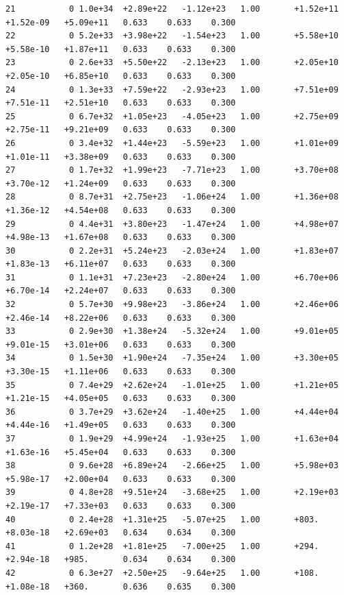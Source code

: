 \documentclass[12pt]{article}
\numberwithin{equation}{section}
\begin{document}
\begin{lstlisting}
21           0 1.0e+34  +2.89e+22   -1.12e+23   1.00       +1.52e+11   +1.52e-09   +5.09e+11   0.633    0.633    0.300
22           0 5.2e+33  +3.98e+22   -1.54e+23   1.00       +5.58e+10   +5.58e-10   +1.87e+11   0.633    0.633    0.300
23           0 2.6e+33  +5.50e+22   -2.13e+23   1.00       +2.05e+10   +2.05e-10   +6.85e+10   0.633    0.633    0.300
24           0 1.3e+33  +7.59e+22   -2.93e+23   1.00       +7.51e+09   +7.51e-11   +2.51e+10   0.633    0.633    0.300
25           0 6.7e+32  +1.05e+23   -4.05e+23   1.00       +2.75e+09   +2.75e-11   +9.21e+09   0.633    0.633    0.300
26           0 3.4e+32  +1.44e+23   -5.59e+23   1.00       +1.01e+09   +1.01e-11   +3.38e+09   0.633    0.633    0.300
27           0 1.7e+32  +1.99e+23   -7.71e+23   1.00       +3.70e+08   +3.70e-12   +1.24e+09   0.633    0.633    0.300
28           0 8.7e+31  +2.75e+23   -1.06e+24   1.00       +1.36e+08   +1.36e-12   +4.54e+08   0.633    0.633    0.300
29           0 4.4e+31  +3.80e+23   -1.47e+24   1.00       +4.98e+07   +4.98e-13   +1.67e+08   0.633    0.633    0.300
30           0 2.2e+31  +5.24e+23   -2.03e+24   1.00       +1.83e+07   +1.83e-13   +6.11e+07   0.633    0.633    0.300
31           0 1.1e+31  +7.23e+23   -2.80e+24   1.00       +6.70e+06   +6.70e-14   +2.24e+07   0.633    0.633    0.300
32           0 5.7e+30  +9.98e+23   -3.86e+24   1.00       +2.46e+06   +2.46e-14   +8.22e+06   0.633    0.633    0.300
33           0 2.9e+30  +1.38e+24   -5.32e+24   1.00       +9.01e+05   +9.01e-15   +3.01e+06   0.633    0.633    0.300
34           0 1.5e+30  +1.90e+24   -7.35e+24   1.00       +3.30e+05   +3.30e-15   +1.11e+06   0.633    0.633    0.300
35           0 7.4e+29  +2.62e+24   -1.01e+25   1.00       +1.21e+05   +1.21e-15   +4.05e+05   0.633    0.633    0.300
36           0 3.7e+29  +3.62e+24   -1.40e+25   1.00       +4.44e+04   +4.44e-16   +1.49e+05   0.633    0.633    0.300
37           0 1.9e+29  +4.99e+24   -1.93e+25   1.00       +1.63e+04   +1.63e-16   +5.45e+04   0.633    0.633    0.300
38           0 9.6e+28  +6.89e+24   -2.66e+25   1.00       +5.98e+03   +5.98e-17   +2.00e+04   0.633    0.633    0.300
39           0 4.8e+28  +9.51e+24   -3.68e+25   1.00       +2.19e+03   +2.19e-17   +7.33e+03   0.633    0.633    0.300
40           0 2.4e+28  +1.31e+25   -5.07e+25   1.00       +803.       +8.03e-18   +2.69e+03   0.634    0.634    0.300
41           0 1.2e+28  +1.81e+25   -7.00e+25   1.00       +294.       +2.94e-18   +985.       0.634    0.634    0.300
42           0 6.3e+27  +2.50e+25   -9.64e+25   1.00       +108.       +1.08e-18   +360.       0.636    0.635    0.300

\end{lstlisting}
\end{document}
